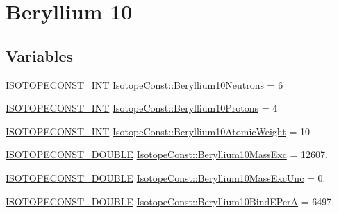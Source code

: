 \hypertarget{group___isotope_const-_beryllium-_be10}{}\section{Beryllium 10}
\label{group___isotope_const-_beryllium-_be10}
\subsection*{Variables}
\begin{DoxyCompactItemize}
\item 
\mbox{\hyperlink{group___isotope_const-_macros_ga5f18360b3e99483a35c32d789e62621c}{I\+S\+O\+T\+O\+P\+E\+C\+O\+N\+S\+T\+\_\+\+I\+NT}} \mbox{\hyperlink{group___isotope_const-_beryllium-_be10_gac88cba4edc01c8b78b02c5c75621e21d}{Isotope\+Const\+::\+Beryllium10\+Neutrons}} = 6
\item 
\mbox{\hyperlink{group___isotope_const-_macros_ga5f18360b3e99483a35c32d789e62621c}{I\+S\+O\+T\+O\+P\+E\+C\+O\+N\+S\+T\+\_\+\+I\+NT}} \mbox{\hyperlink{group___isotope_const-_beryllium-_be10_ga9d3f71f87075d688d43ada31e81d14b5}{Isotope\+Const\+::\+Beryllium10\+Protons}} = 4
\item 
\mbox{\hyperlink{group___isotope_const-_macros_ga5f18360b3e99483a35c32d789e62621c}{I\+S\+O\+T\+O\+P\+E\+C\+O\+N\+S\+T\+\_\+\+I\+NT}} \mbox{\hyperlink{group___isotope_const-_beryllium-_be10_ga077f84f155ef6b9f4a49a0b0f7158984}{Isotope\+Const\+::\+Beryllium10\+Atomic\+Weight}} = 10
\item 
\mbox{\hyperlink{group___isotope_const-_macros_ga8f45a7272ce02c0b4c65c44636ed719a}{I\+S\+O\+T\+O\+P\+E\+C\+O\+N\+S\+T\+\_\+\+D\+O\+U\+B\+LE}} \mbox{\hyperlink{group___isotope_const-_beryllium-_be10_ga2bb070eac8c9582e79099772cb6eee2e}{Isotope\+Const\+::\+Beryllium10\+Mass\+Exc}} = 12607.
\item 
\mbox{\hyperlink{group___isotope_const-_macros_ga8f45a7272ce02c0b4c65c44636ed719a}{I\+S\+O\+T\+O\+P\+E\+C\+O\+N\+S\+T\+\_\+\+D\+O\+U\+B\+LE}} \mbox{\hyperlink{group___isotope_const-_beryllium-_be10_ga113c9beb8929ca0a0ac12f8c122efb8b}{Isotope\+Const\+::\+Beryllium10\+Mass\+Exc\+Unc}} = 0.
\item 
\mbox{\hyperlink{group___isotope_const-_macros_ga8f45a7272ce02c0b4c65c44636ed719a}{I\+S\+O\+T\+O\+P\+E\+C\+O\+N\+S\+T\+\_\+\+D\+O\+U\+B\+LE}} \mbox{\hyperlink{group___isotope_const-_beryllium-_be10_ga7636fbb5e250ccd1cac13480222866c1}{Isotope\+Const\+::\+Beryllium10\+Bind\+E\+PerA}} = 6497.
\item 

\end{DoxyCompactItemize}
